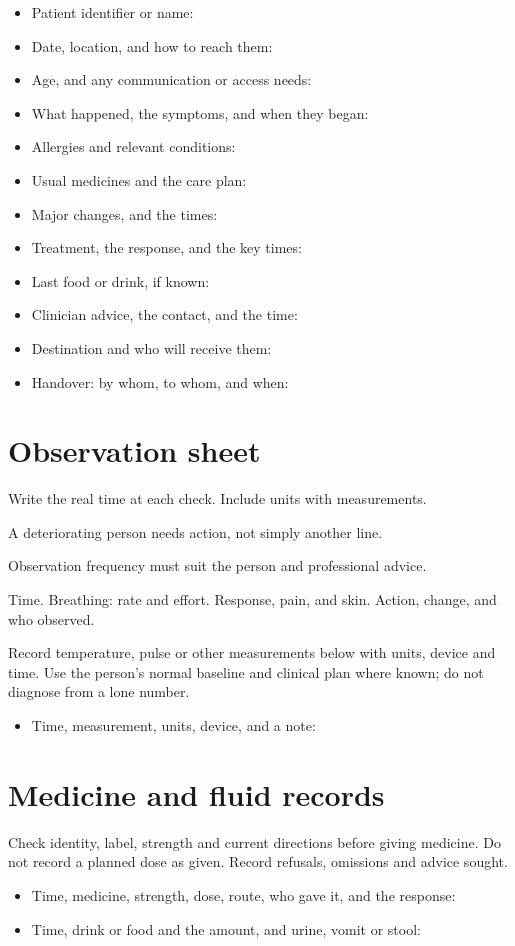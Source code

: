 \documentclass[10pt,openright]{book}
\begin{document}
\begin{itemize}
\item Patient identifier or name:
\item Date, location, and how to reach them:
\item Age, and any communication or access needs:
\item What happened, the symptoms, and when they began:
\item Allergies and relevant conditions:
\item Usual medicines and the care plan:
\item Major changes, and the times:
\item Treatment, the response, and the key times:
\item Last food or drink, if known:
\item Clinician advice, the contact, and the time:
\item Destination and who will receive them:
\item Handover: by whom, to whom, and when:
\end{itemize}
\section*{Observation sheet}
Write the real time at each check. Include units with measurements.

A deteriorating person needs action, not simply another line.

Observation frequency must suit the person and professional advice.

Time. Breathing: rate and effort. Response, pain, and skin. Action, change, and who observed.

Record temperature, pulse or other measurements below with units, device and time. Use the person's normal baseline and clinical plan where known; do not diagnose from a lone number.

\begin{itemize}
\item Time, measurement, units, device, and a note:
\end{itemize}
\section*{Medicine and fluid records}
Check identity, label, strength and current directions before giving medicine. Do not record a planned dose as given. Record refusals, omissions and advice sought.

\begin{itemize}
\item Time, medicine, strength, dose, route, who gave it, and the response:
\item Time, drink or food and the amount, and urine, vomit or stool:
\end{itemize}
\end{document}
